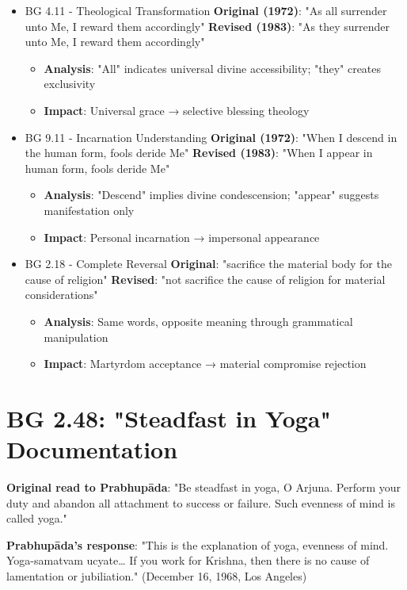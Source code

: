 \documentclass[11pt,twoside]{book}
\begin{document}
\begin{itemize}
\item BG 4.11 - Theological Transformation
\label{sec:orga002857}
\textbf{\textbf{Original (1972)}}: "As all surrender unto Me, I reward them accordingly"
\textbf{\textbf{Revised (1983)}}: "As they surrender unto Me, I reward them accordingly"
\begin{itemize}
\item \textbf{\textbf{Analysis}}: "All" indicates universal divine accessibility; "they" creates exclusivity
\item \textbf{\textbf{Impact}}: Universal grace → selective blessing theology
\end{itemize}
\item BG 9.11 - Incarnation Understanding
\label{sec:orgabcd46f}
\textbf{\textbf{Original (1972)}}: "When I descend in the human form, fools deride Me"
\textbf{\textbf{Revised (1983)}}: "When I appear in human form, fools deride Me"
\begin{itemize}
\item \textbf{\textbf{Analysis}}: "Descend" implies divine condescension; "appear" suggests manifestation only
\item \textbf{\textbf{Impact}}: Personal incarnation → impersonal appearance
\end{itemize}
\item BG 2.18 - Complete Reversal
\label{sec:org3b15c1f}
\textbf{\textbf{Original}}: "sacrifice the material body for the cause of religion" 
\textbf{\textbf{Revised}}: "not sacrifice the cause of religion for material considerations"
\begin{itemize}
\item \textbf{\textbf{Analysis}}: Same words, opposite meaning through grammatical manipulation
\item \textbf{\textbf{Impact}}: Martyrdom acceptance → material compromise rejection
\end{itemize}
\end{itemize}
\section*{BG 2.48: "Steadfast in Yoga" Documentation}
\label{sec:org6264c32}
\textbf{\textbf{Original read to Prabhupāda}}: "Be steadfast in yoga, O Arjuna. Perform your duty and abandon all attachment to success or failure. Such evenness of mind is called yoga."

\textbf{\textbf{Prabhupāda's response}}: "This is the explanation of yoga, evenness of mind. Yoga-samatvam ucyate\ldots{} If you work for Krishna, then there is no cause of lamentation or jubiliation." (December 16, 1968, Los Angeles)
\end{document}
